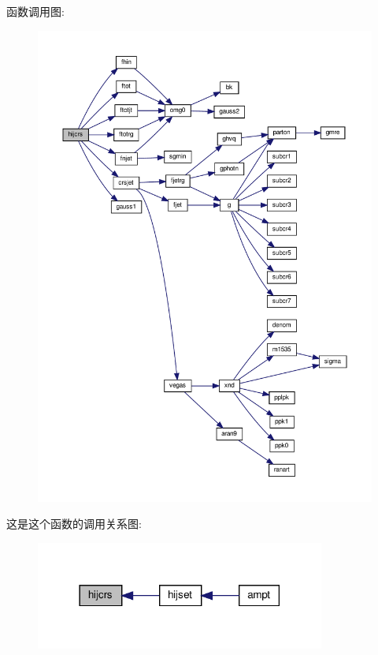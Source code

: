 函数调用图\+:
\nopagebreak
\begin{figure}[H]
\begin{center}
\leavevmode
\includegraphics[width=350pt]{hijcrs_8f90_a9aa6779b47b0a9cbc14d258c88676ccd_cgraph}
\end{center}
\end{figure}
这是这个函数的调用关系图\+:
\nopagebreak
\begin{figure}[H]
\begin{center}
\leavevmode
\includegraphics[width=270pt]{hijcrs_8f90_a9aa6779b47b0a9cbc14d258c88676ccd_icgraph}
\end{center}
\end{figure}
